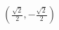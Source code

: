 \documentclass[preview]{standalone}
\begin{document}
\begin{align*}
\left(\frac{\sqrt{2}}{2}, -\frac{\sqrt{2}}{2}\right)
\end{align*}
\end{document}
